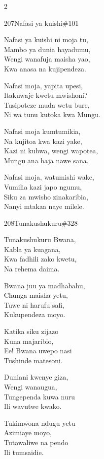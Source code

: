 \begin{multicols}{2}
\begin{hymn}{207}{Nafasi ya kuishi}{\#101}
\begin{stanza}
Nafasi ya kuishi ni moja tu,\\
Mambo ya dunia hayadumu,\\
Wengi wanafuja maisha yao,\\
Kwa anasa na kujipendeza.
\end{stanza}
\begin{stanza}
Nafasi moja, yapita upesi,\\
Itakuwaje kwetu mwishoni?\\
Tusipoteze muda wetu bure,\\
Ni wa tunu kutoka kwa Mungu.
\end{stanza}
\begin{stanza}
Nafasi moja kumtumikia,\\
Na kujitoa kwa kazi yake,\\
Kazi ni kubwa, wengi wapotea,\\
Mungu ana haja nawe sana.
\end{stanza}
\begin{stanza}
Nafasi moja, watumishi wake,\\
Vumilia kazi japo ngumu,\\
Siku za mwisho zinakaribia,\\
Nanyi mtakaa naye milele.
\end{stanza}
\end{hymn}

\begin{hymn}{208}{Tunakushukuru}{\#328}
\begin{stanza}
Tunakushukuru Bwana,\\
Kabla ya kuagana,\\
Kwa fadhili zako kwetu,\\
Na rehema daima.
\end{stanza}
\begin{chorus}
Bwana juu ya madhabahu,\\
Chunga maisha yetu,\\
Tuwe ni harufu safi,\\
Kukupendeza moyo.
\end{chorus}
\begin{stanza}
Katika siku zijazo\\
Kuna majaribio,\\
Ee! Bwana uwepo nasi\\
Tushinde matesoni.
\end{stanza}
\begin{stanza}
Duniani kwenye giza,\\
Wengi wanaugua,\\
Tungependa kuwa nuru\\
Ili wavutwe kwako.
\end{stanza}
\begin{stanza}
Tukimwona ndugu yetu\\
Azimiaye moyo,\\
Tutawaliwe na pendo\\
Ili tumsaidie.
\end{stanza}
\end{hymn}


\end{multicols}
